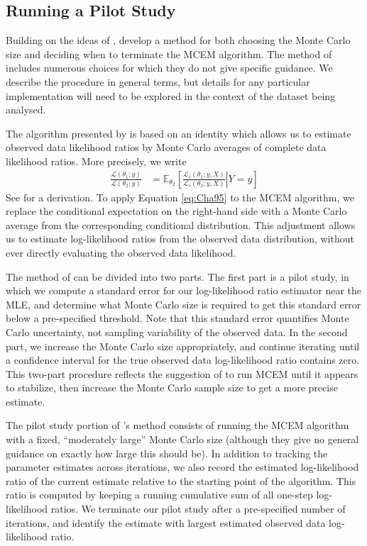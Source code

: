 \documentclass[11pt, oneside]{article}   	%
\newcommand{\bE}{\mathbb{E}}
\begin{document}
\subsection{Running a Pilot Study \citep{Cha95}}

Building on the ideas of \citeauthor{Wei90}, \citet{Cha95} develop a method for both choosing the Monte Carlo size and deciding when to terminate the MCEM algorithm. The method of \citeauthor{Cha95} includes numerous choices for which they do not give specific guidance. We describe the procedure in general terms, but details for any particular implementation will need to be explored in the context of the dataset being analysed. 

The algorithm presented by \citeauthor{Cha95} is based on an identity which allows us to estimate observed data likelihood ratios by Monte Carlo averages of complete data likelihood ratios. More precisely, we write
%
\begin{align}
	\frac{\mathcal{L}(\theta_1; y)}{\mathcal{L}(\theta_2; y)} &= \bE_{\theta_2} \left[ \left. \frac{\mathcal{L}_c(\theta_1; y, X)}{\mathcal{L}_c(\theta_2; y, X)} \right| Y=y \right] \label{eq:Cha95}
\end{align}
%
See \citet{Cha95} for a derivation. To apply Equation \ref{eq:Cha95} to the MCEM algorithm, we replace the conditional expectation on the right-hand side with a Monte Carlo average from the corresponding conditional distribution. This adjustment allows us to estimate log-likelihood ratios from the observed data distribution, without ever directly evaluating the observed data likelihood. 



The method of \citeauthor{Cha95} can be divided into two parts. The first part is a pilot study, in which we compute a standard error for our log-likelihood ratio estimator near the MLE, and determine what Monte Carlo size is required to get this standard error below a pre-specified threshold. Note that this standard error quantifies Monte Carlo uncertainty, not sampling variability of the observed data. In the second part, we increase the Monte Carlo size appropriately, and continue iterating until a confidence interval for the true observed data log-likelihood ratio contains zero. This two-part procedure reflects the suggestion of \citet{Wei90} to run MCEM until it appears to stabilize, then increase the Monte Carlo sample size to get a more precise estimate.


The pilot study portion of \citeauthor{Cha95}'s method consists of running the MCEM algorithm with a fixed, ``moderately large'' Monte Carlo size (although they give no general guidance on exactly how large this should be).  In addition to tracking the parameter estimates across iterations, we also record the estimated log-likelihood ratio of the current estimate relative to the starting point of the algorithm. This ratio is computed by keeping a running cumulative sum of all one-step log-likelihood ratios. We terminate our pilot study after a pre-specified number of iterations, and identify the estimate with largest estimated observed data log-likelihood ratio. 
\end{document}
